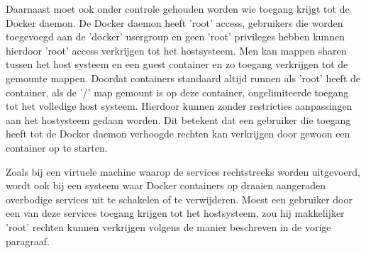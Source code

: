 
Daarnaast moet ook onder controle gehouden worden wie toegang krijgt tot de Docker daemon. De Docker daemon heeft 'root' access, gebruikers die worden toegevoegd aan de 'docker' usergroup en geen 'root' privileges hebben kunnen hierdoor 'root' access verkrijgen tot het hostsysteem. Men kan mappen sharen tussen het host systeem en een guest container en zo toegang verkrijgen tot de gemounte mappen. Doordat containers standaard altijd runnen als 'root' heeft de container, als de '/' map gemount is op deze container, ongelimiteerde toegang tot het volledige host systeem. Hierdoor kunnen zonder restricties aanpassingen aan het hostysteem gedaan worden. Dit betekent dat een gebruiker die toegang heeft tot de Docker daemon verhoogde rechten kan verkrijgen door gewoon een container op te starten.

Zoals bij een virtuele machine waarop de services rechtstreeks worden uitgevoerd, wordt ook bij een systeem waar Docker containers op draaien aangeraden overbodige services uit te schakelen of te verwijderen. Moest een gebruiker door een van deze services toegang krijgen tot het hostsysteem, zou hij makkelijker 'root' rechten kunnen verkrijgen volgens de manier beschreven in de vorige paragraaf.

